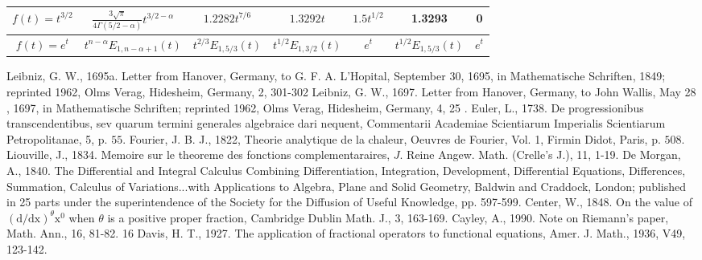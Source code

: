 \documentclass[a4paper,14pt,oneside]{book}
\theoremstyle{plain}
\theoremstyle{definition}
\theoremstyle{remark}
\begin{document}
\begin{landscape}
\begin{center}
{\begin{tabular}{|c|c|c|c|c|c|c|}
      \hline
      $ f(t)=t^{3/2} $ & $\frac{3\sqrt{\pi}}{4\Gamma (5/2 - \alpha)} t^{3/2 -\alpha}$ & $1.2282 t^{7/6}$& $1.3292 t$ & $1.5t^{1/2}$ & 1.3293 & 0 \\
      \hline
      $ f(t)=e^{t} $ &$t^{n-\alpha} E_{1, n-\alpha+1} (t)$ & $t^{2/3} E_{1,5/3} (t)$ & $t^{1/2} E_{1,3/2} (t)$  & $e^{t}$ & $t^{1/2} E_{1,5/3}(t)$ & $e^{t}$\\
      \hline
        \end{tabular}}
        \end{center}
        \end{landscape}
    
    \thispagestyle{plain}
    
    \newpage
         \begin{center}
\justify
\Large{
\begin{thebibliography}{99} 
Leibniz, G. W., 1695a. Letter from Hanover, Germany, to G. F. A. L'Hopital,
September 30, 1695, in Mathematische Schriften, 1849; reprinted 1962, Olms Verag,
Hidesheim, Germany, 2, 301-302
Leibniz, G. W., 1697. Letter from Hanover, Germany, to John Wallis, May 28 , 1697, in Mathematische Schriften; reprinted 1962, Olms Verag, Hidesheim,
Germany, 4, 25 .
Euler, L., 1738. De progressionibus transcendentibus, sev quarum termini generales algebraice dari nequent, Commentarii Academiae Scientiarum Imperialis
Scientiarum Petropolitanae, 5, p. $55 .$
Fourier, J. B. J., 1822, Theorie analytique de la chaleur, Oeuvres de Fourier, Vol. 1, Firmin Didot, Paris, p. $508 .$
Liouville, J., 1834. Memoire sur le theoreme des fonctions complementaraires, $J$. Reine Angew. Math. (Crelle's J.), 11, 1-19.
 De Morgan, A., 1840. The Differential and Integral Calculus Combining Differentiation, Integration, Development, Differential Equations, Differences, Summation, Calculus of Variations...with Applications to Algebra, Plane and Solid Geometry, Baldwin and Craddock, London; published in 25 parts under the superintendence of the Society for the Diffusion of Useful Knowledge, pp. 597-599. 
 Center, W., 1848. On the value of $(\mathrm{d} / \mathrm{dx})^{\theta} \mathrm{x}^{0}$ when $\theta$ is a positive proper fraction, Cambridge Dublin Math. J., 3, 163-169.
 Cayley, A., 1990. Note on Riemann's paper, Math. Ann., 16, 81-82.
16
 Davis, H. T., 1927. The application of fractional operators to functional equations, Amer. J. Math., 1936, V49, 123-142.

\end{thebibliography}}
\end{center}
\end{document}
